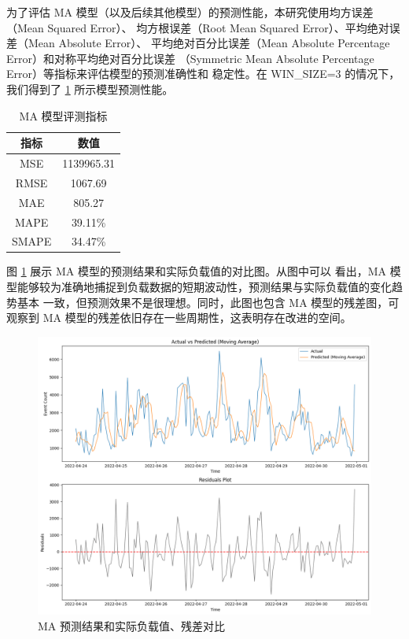 \documentclass[a4paper,AutoFakeBold,oneside,12pt]{book}
\begin{document}
为了评估 MA 模型（以及后续其他模型）的预测性能，本研究使用均方误差（Mean Squared Error）、
均方根误差（Root Mean Squared Error）、平均绝对误差（Mean Absolute Error）、
平均绝对百分比误差（Mean Absolute Percentage Error）和对称平均绝对百分比误差
（Symmetric Mean Absolute Percentage Error）等指标来评估模型的预测准确性和
稳定性。在 WIN\_SIZE=3 的情况下，我们得到了 \ref*{table:ma_regression_metrics} 
所示模型预测性能。

\begin{table}[tbp]
\centering
\caption{MA 模型评测指标}
\label{table:ma_regression_metrics}
\begin{tabular}{c|c}
\hline
\textbf{指标} & \textbf{数值} \\
\hline
MSE & 1139965.31 \\
RMSE & 1067.69 \\
MAE & 805.27 \\
MAPE & 39.11\% \\
SMAPE & 34.47\% \\
\hline
\end{tabular}
\end{table}

图 \ref{fig:ma-prediction} 展示 MA 模型的预测结果和实际负载值的对比图。从图中可以
看出，MA 模型能够较为准确地捕捉到负载数据的短期波动性，预测结果与实际负载值的变化趋势基本
一致，但预测效果不是很理想。同时，此图也包含 MA 模型的残差图，可观察到 MA 
模型的残差依旧存在一些周期性，这表明存在改进的空间。

\begin{figure}[htbp]
\centering
\includegraphics[width=1.0\textwidth]{images/ma-prediction.png}
\caption{MA 预测结果和实际负载值、残差对比}
\label{fig:ma-prediction}
\end{figure}
\end{document}
